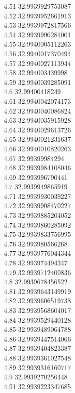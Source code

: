 {4.51	32.9939929753087\\
4.52	32.9939952661913\\
4.53	32.9939972817566\\
4.54	32.9939990281001\\
4.55	32.9940005112263\\
4.56	32.9940017370494\\
4.57	32.9940027113944\\
4.58	32.994003439998\\
4.59	32.9940039285091\\
4.6	32.99400418249\\
4.61	32.9940042074173\\
4.62	32.9940040086824\\
4.63	32.9940035915928\\
4.64	32.9940029613726\\
4.65	32.9940021231637\\
4.66	32.9940010820263\\
4.67	32.99399984294\\
4.68	32.9939984108046\\
4.69	32.993996790441\\
4.7	32.9939949865919\\
4.71	32.9939930039227\\
4.72	32.9939908470227\\
4.73	32.9939885204052\\
4.74	32.9939860285092\\
4.75	32.9939833756995\\
4.76	32.993980566268\\
4.77	32.9939776044344\\
4.78	32.993974494347\\
4.79	32.9939712400836\\
4.8	32.9939678456522\\
4.81	32.9939643149919\\
4.82	32.9939606519738\\
4.83	32.9939568604017\\
4.84	32.9939529440128\\
4.85	32.9939489064788\\
4.86	32.9939447514066\\
4.87	32.9939404823387\\
4.88	32.9939361027548\\
4.89	32.9939316160717\\
4.9	32.9939270256448\\
4.91	32.9939223347685\\
}
